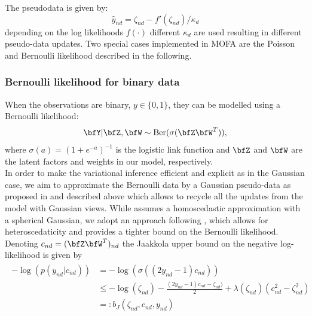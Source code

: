 The pseudodata is given by:
\begin{equation*}
\hat{y}_{nd} = \zeta_{nd} - f'(\zeta_{nd})/\kappa_d
\end{equation*}
depending on the log likelihoods $f(\cdot)$ different $\kappa_d$ are used resulting in different pseudo-data updates. Two special cases implemented in MOFA are the Poisson and Bernoulli likelihood described in the following.

\subsubsection*{Bernoulli likelihood for binary data}
When the observations are binary, $y \in \{0,1\}$, they can be modelled using a Bernoulli likelihood:
\begin{equation*}
\bfY|\bfZ,\bfW \sim \text{Ber}(\sigma(\bfZ\bfW^T)),
\end{equation*} where $\sigma(a)=(1+e^{-a})^{-1}$ is the logistic link function and $\bfZ$ and $\bfW$ are the latent factors and weights in our model, respectively.\\
In order to make the variational  inference efficient and explicit as in the Gaussian case, we aim to approximate the Bernoulli data by a Gaussian pseudo-data as proposed in \cite{Seeger2012} and described above which allows to recycle all the updates from the model with Gaussian views. While \cite{Seeger2012} assumes a homoscedastic approximation with a spherical Gaussian, we adopt an approach following \cite{Jaakkola2000}, which allows for heteroscedaticity and provides a tighter bound on the Bernoulli likelihood.\\
Denoting $c_{nd}=(\bfZ\bfW^T)_{nd}$ the Jaakkola upper bound \cite{Jaakkola2000} on the negative log-likelihood is given by
\begin{align*}
\begin{split}
-\log\left(p(y_{nd}|c_{nd})\right) &= -\log\left(\sigma\left((2y_{nd}-1)  c_{nd}\right)\right)\\
& \leq -\log(\zeta_{nd})-\frac{(2y_{nd}-1)c_{nd}-\zeta_{nd})}{2} +\lambda(\zeta_{nd})\left(c_{nd}^2 -\zeta_{nd}^2 \right)\\
& =: b_J(\zeta_{nd}, c_{nd},y_{nd} )
\label{jaakkola}
\end{split}
\end{align*}

